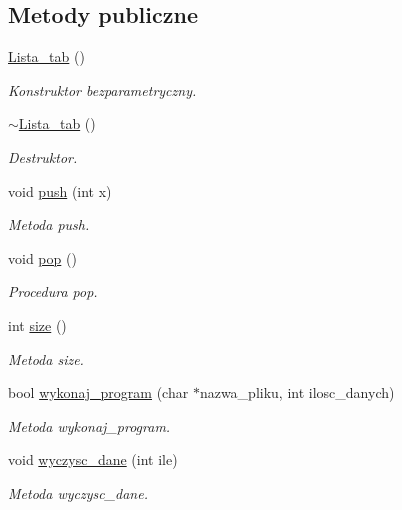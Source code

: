 \subsection*{Metody publiczne}
\begin{DoxyCompactItemize}
\item 
\hyperlink{class_lista__tab_af10d3131eadfebb4df8abbe6379e6d7c}{Lista\-\_\-tab} ()
\begin{DoxyCompactList}\small\item\em Konstruktor bezparametryczny. \end{DoxyCompactList}\item 
\hyperlink{class_lista__tab_aaf55f952c14d2996c6f1e09acd718528}{$\sim$\-Lista\-\_\-tab} ()
\begin{DoxyCompactList}\small\item\em Destruktor. \end{DoxyCompactList}\item 
void \hyperlink{class_lista__tab_a800998768639b41b5be5c52ec4ccbda4}{push} (int x)
\begin{DoxyCompactList}\small\item\em Metoda push. \end{DoxyCompactList}\item 
void \hyperlink{class_lista__tab_affc42a7ffc6eda21076fc56eae38e980}{pop} ()
\begin{DoxyCompactList}\small\item\em Procedura pop. \end{DoxyCompactList}\item 
int \hyperlink{class_lista__tab_af092dd7943f7cd5ff407485f2991a1e4}{size} ()
\begin{DoxyCompactList}\small\item\em Metoda size. \end{DoxyCompactList}\item 
bool \hyperlink{class_lista__tab_ac9adc6ecc7348c5e1871b239c1313405}{wykonaj\-\_\-program} (char $\ast$nazwa\-\_\-pliku, int ilosc\-\_\-danych)
\begin{DoxyCompactList}\small\item\em Metoda wykonaj\-\_\-program. \end{DoxyCompactList}\item 
void \hyperlink{class_lista__tab_a506a6de79a600bac8316a6caf9878528}{wyczysc\-\_\-dane} (int ile)
\begin{DoxyCompactList}\small\item\em Metoda wyczysc\-\_\-dane. \end{DoxyCompactList}\end{DoxyCompactItemize}
